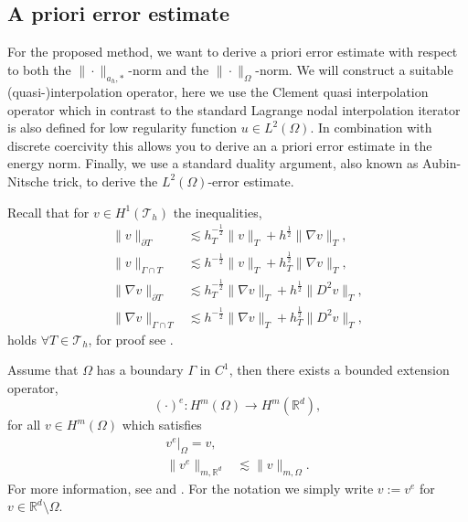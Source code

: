 
\subsection{A priori error estimate}%
\label{sec:a_priori_estimates}


For the proposed method, we want to derive a priori error estimate with respect to both the  $\| \cdot  \|_{a_{h},*   }^{  } $-norm and the  $\| \cdot  \|_{ \Omega  }^{
} $-norm.
We will construct a suitable (quasi-)interpolation operator, here we use the Clement quasi interpolation operator which in contrast to the standard Lagrange nodal interpolation iterator is also defined for low regularity function $u \in L^{2}(
\Omega ) $.
In combination with discrete coercivity this allows you to derive an a priori error estimate in the energy norm. Finally, we use a standard duality argument, also known as Aubin-Nitsche trick, to derive the $L^{2}( \Omega ) $-error estimate.

Recall that for $v \in H^{1}( \mathcal{T } _{h}) $ the inequalities,
\begin{align}
    \| v \|_{ \partial T }^{  } &\lesssim h^{-\frac{1}{2}}_{T}\|  v \|_{ T }^{  }+ h^{\frac{1}{2}} \| \nabla v \|_{T  }^{   }  , \\
    \| v \|_{ \Gamma \cap T }^{  } &\lesssim  h^{-\frac{1}{2}} \| v \|_{T  }^{  }   + h^{\frac{1}{2}}_{T} \| \nabla v \|_{ T }^{  },\\
    \| \nabla v \|_{ \partial T }^{  } &\lesssim h^{-\frac{1}{2}}_{T}\|  \nabla v \|_{ T }^{  }+ h^{\frac{1}{2}} \| D^2 v \|_{T  }^{   }  , \\
    \| \nabla v \|_{ \Gamma \cap T }^{  } &\lesssim  h^{-\frac{1}{2}} \| \nabla v \|_{T  }^{  }   + h^{\frac{1}{2}}_{T} \| D^2 v \|_{ T }^{  },
\end{align}
holds $\forall T \in \mathcal{T} _{h}$, for proof see \cite[Lemma 4.2]{hansbo2003finite}.

Assume that $\Omega $ has a boundary $\Gamma $ in $C^{1}$, then there exists a bounded extension operator,
\begin{equation}
    ( \cdot ) ^{e}: H^{m}( \Omega )  \to H^{m} ( \mathbb{R} ^{d}),
\end{equation}
for all  $v \in H^{m}( \Omega )$ which satisfies
\begin{equation}
    \begin{split}
 v^{e}| _{\Omega } =   v,  \\
\| v^{e} \|_{ m,\mathbb{R} ^{d}  }^{  } & \lesssim \| v \|_{ m, \Omega  }^{  }.
    \end{split}
\end{equation}
For more information, see \cite[Theorem 9.7]{brezis2011functional} and \cite[p.181, p.185]{stein1970singular}. For the notation we simply write $ v := v^{e}   $ for $v \in \mathbb{R} ^{d} \setminus \Omega $.

